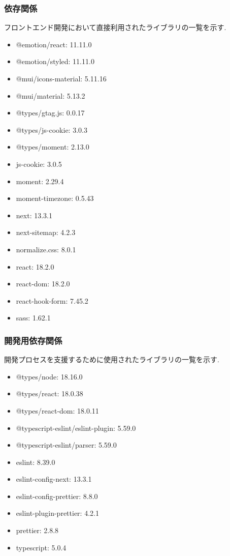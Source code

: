 \documentclass[b5paper,12pt,dvipdfmx]{jsreport}
\begin{document}
\subsubsection{依存関係}
フロントエンド開発において直接利用されたライブラリの一覧を示す.

\begin{itemize}
    \item @emotion/react: 11.11.0
    \item @emotion/styled: 11.11.0
    \item @mui/icons-material: 5.11.16
    \item @mui/material: 5.13.2
    \item @types/gtag.js: 0.0.17
    \item @types/js-cookie: 3.0.3
    \item @types/moment: 2.13.0
    \item js-cookie: 3.0.5
    \item moment: 2.29.4
    \item moment-timezone: 0.5.43
    \item next: 13.3.1
    \item next-sitemap: 4.2.3
    \item normalize.css: 8.0.1
    \item react: 18.2.0
    \item react-dom: 18.2.0
    \item react-hook-form: 7.45.2
    \item sass: 1.62.1
\end{itemize}

\subsubsection{開発用依存関係}
開発プロセスを支援するために使用されたライブラリの一覧を示す.

\begin{itemize}
    \item @types/node: 18.16.0
    \item @types/react: 18.0.38
    \item @types/react-dom: 18.0.11
    \item @typescript-eslint/eslint-plugin: 5.59.0
    \item @typescript-eslint/parser: 5.59.0
    \item eslint: 8.39.0
    \item eslint-config-next: 13.3.1
    \item eslint-config-prettier: 8.8.0
    \item eslint-plugin-prettier: 4.2.1
    \item prettier: 2.8.8
    \item typescript: 5.0.4
\end{itemize}
\end{document}
